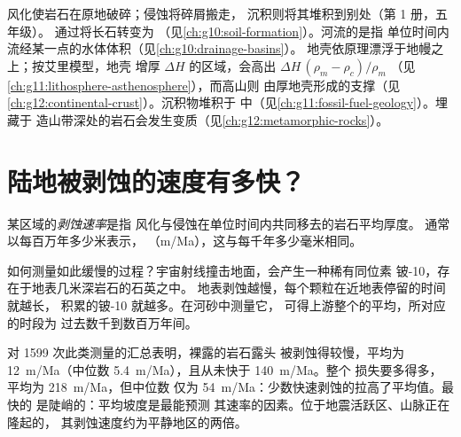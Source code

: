 \begin{recall}
风化使岩石在原地破碎；侵蚀将碎屑搬走，
沉积则将其堆积到别处（第 1 册，五年级）。
通过将长石转变为
（见\cref{ch:g10:soil-formation}）。河流的是指
单位时间内流经某一点的水体体积（见\cref{ch:g10:drainage-basins}）。
地壳依原理漂浮于地幔之上；按艾里模型，地壳
增厚 $\Delta H$ 的区域，会高出 $\Delta H\,(\rho_m - \rho_c)/\rho_m$
（见\cref{ch:g11:lithosphere-asthenosphere}），而高山则
由厚地壳形成的支撑（见\cref{ch:g12:continental-crust}）。沉积物堆积于
中（见\cref{ch:g11:fossil-fuel-geology}）。埋藏于
造山带深处的岩石会发生变质（见\cref{ch:g12:metamorphic-rocks}）。
\end{recall}

\section{陆地被剥蚀的速度有多快？}

\begin{definition}[剥蚀速率]\label{def:g12:destruction-of-mountains:denudation}
某区域的\emph{剥蚀速率}是指
风化与侵蚀在单位时间内共同移去的岩石平均厚度。
通常以每百万年多少米表示，
（\unit{m/Ma}），这与每千年多少毫米相同。
\end{definition}

如何测量如此缓慢的过程？宇宙射线撞击地面，会产生一种稀有同位素
铍-10，存在于地表几米深岩石的石英之中。
地表剥蚀越慢，每个颗粒在近地表停留的时间就越长，
积累的铍-10 就越多。在河砂中测量它，
可得上游整个的平均，所对应的时段为
过去数千到数百万年间。

对 1599 次此类测量的汇总表明，裸露的岩石露头
被剥蚀得较慢，平均为 \qty{12}{m/Ma}（中位数
\qty{5.4}{m/Ma}），且从未快于 \qty{140}{m/Ma}。整个
损失要多得多，平均为 \qty{218}{m/Ma}，但中位数
仅为 \qty{54}{m/Ma}：少数快速剥蚀的拉高了平均值。最快的
是陡峭的：平均坡度是最能预测
其速率的因素。位于地震活跃区、山脉正在隆起的，
其剥蚀速度约为平静地区的两倍。

